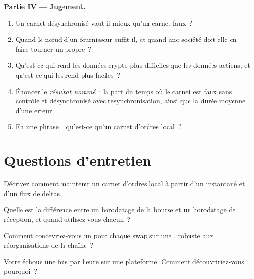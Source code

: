 \begin{problem}
\medskip\noindent\textbf{Partie IV --- Jugement.}
\begin{enumerate}[resume]
\item Un carnet désynchronisé vaut-il mieux qu'un carnet faux~?
\item Quand le nœud d'un fournisseur suffit-il, et quand une société doit-elle en faire tourner un propre~?
\item Qu'est-ce qui rend les données crypto plus difficiles que les données actions, et qu'est-ce qui les rend plus faciles~?
\item Énoncer le \emph{résultat nommé}~: la part du temps où le carnet est faux sans contrôle et désynchronisé avec resynchronisation, ainsi que la durée moyenne d'une erreur.
\item En une phrase~: qu'est-ce qu'un carnet d'ordres local~?
\end{enumerate}
\end{problem}

\section{Questions d'entretien}

\begin{interviewq}\label{iq:m3:crypto-data-and-infrastructure:1}
Décrivez comment maintenir un carnet d'ordres local à partir d'un instantané et d'un flux de deltas.
\end{interviewq}

\begin{interviewq}\label{iq:m3:crypto-data-and-infrastructure:2}
Quelle est la différence entre un horodatage de la bourse et un horodatage de réception, et quand utilisez-vous chacun~?
\end{interviewq}

\begin{interviewq}\label{iq:m3:crypto-data-and-infrastructure:3}
Comment concevriez-vous un  pour chaque swap sur une , robuste aux réorganisations de la chaîne~?
\end{interviewq}

\begin{interviewq}\label{iq:m3:crypto-data-and-infrastructure:4}
Votre  échoue une fois par heure sur une plateforme. Comment découvririez-vous pourquoi~?
\end{interviewq}

